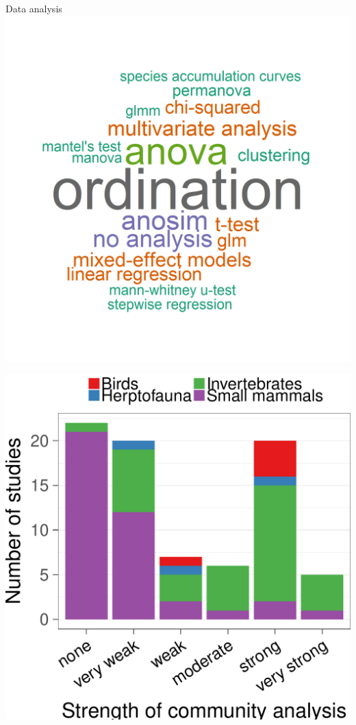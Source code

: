 \documentclass[final]{beamer}\usepackage[]{graphicx}\usepackage[]{color}
\makeatletter
\def\maxwidth{ %
  \ifdim\Gin@nat@width>\linewidth
    \linewidth
  \else
    \Gin@nat@width
  \fi
}
\newenvironment{knitrout}{}{} %
\newlength{\twocolwid}
\makeatother
\begin{document}
\begin{frame}[t]
\begin{columns}[t]
\begin{column}{\twocolwid}
\begin{columns}[t,totalwidth=\twocolwid]
\begin{column}{0.38\textwidth} %
\vspace{-1cm}
\begin{block}{Data analysis}
\includegraphics[trim=1.2cm 1cm 1.5cm 2cm, clip, width=1\linewidth]{figure/analyses_wc} 

\begin{knitrout}
\color{fgcolor}

\includegraphics[width=\maxwidth]{figure/beamer-strength-1} \hfill{}




\end{knitrout}
\end{block}
\end{column}
\end{columns}
\end{column}
\end{columns}
\end{frame}
\end{document}
